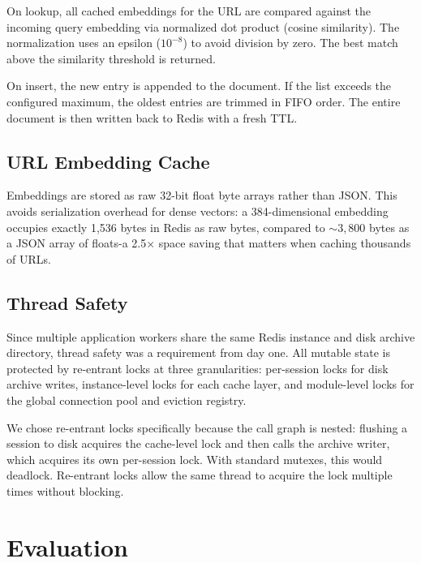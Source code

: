 \documentclass[conference]{IEEEtran}
\begin{document}
On lookup, all cached embeddings for the URL are compared against the incoming query embedding via normalized dot product (cosine similarity). The normalization uses an epsilon ($10^{-8}$) to avoid division by zero. The best match above the similarity threshold is returned.

On insert, the new entry is appended to the document. If the list exceeds the configured maximum, the oldest entries are trimmed in FIFO order. The entire document is then written back to Redis with a fresh TTL.

\subsection{URL Embedding Cache}

Embeddings are stored as raw 32-bit float byte arrays rather than JSON. This avoids serialization overhead for dense vectors: a 384-dimensional embedding occupies exactly 1{,}536 bytes in Redis as raw bytes, compared to ${\sim}3{,}800$ bytes as a JSON array of floats-a 2.5$\times$ space saving that matters when caching thousands of URLs.

\subsection{Thread Safety}

Since multiple application workers share the same Redis instance and disk archive directory, thread safety was a requirement from day one. All mutable state is protected by re-entrant locks at three granularities: per-session locks for disk archive writes, instance-level locks for each cache layer, and module-level locks for the global connection pool and eviction registry.

We chose re-entrant locks specifically because the call graph is nested: flushing a session to disk acquires the cache-level lock and then calls the archive writer, which acquires its own per-session lock. With standard mutexes, this would deadlock. Re-entrant locks allow the same thread to acquire the lock multiple times without blocking.

\section{Evaluation}
\label{sec:evaluation}
\end{document}
